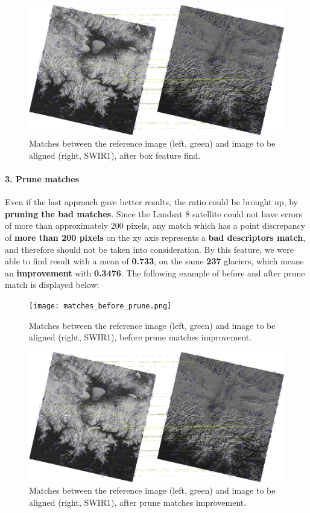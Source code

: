 \documentclass[12pt, a4paper]{report}
\begin{document}
	\begin{figure}[H]
		\centering
		\includegraphics[scale=0.25]{matches_2.png}
		\caption{Matches between the reference image (left, green) and image to be aligned (right, SWIR1), after box feature find.}
		\label{fig:bad_reference_1}
	\end{figure}
	
	\paragraph{3. Prune matches} Even if the last approach gave better results, the ratio could be brought up, by \textbf{pruning the bad matches}. Since the Landsat 8 satellite could not have errors of more than approximately 200 pixels, any match which has a point discrepancy of \textbf{more than 200 pixels} on the xy axis represents a \textbf{bad descriptors match}, and therefore should not be taken into consideration.  By this feature, we were able to find result with a mean of \textbf{0.733}, on the same \textbf{237} glaciers, which means an \textbf{improvement} with \textbf{0.3476}. The following example of before and after prune match is displayed below:
	
	\begin{figure}[H]
		\centering
		\texttt{[image: matches\_before\_prune.png]}
		\caption{Matches between the reference image (left, green) and image to be aligned (right, SWIR1), before prune matches improvement.}
		\label{fig:bad_matches_2}
	\end{figure}
	
	\begin{figure}[H]
		\centering
		\includegraphics[scale=0.25]{matches_after_prune.png}
		\caption{Matches between the reference image (left, green) and image to be aligned (right, SWIR1), after prune matches improvement.}
		\label{fig:bad_matches_3}
	\end{figure}
	
\end{document}
